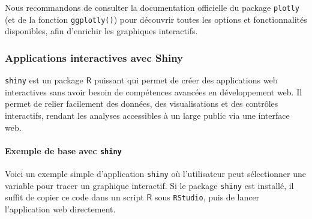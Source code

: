 \documentclass[
  letterpaper,
  DIV=11,
  numbers=noendperiod,
  oneside]{scrreprt}
\let\oldparagraph\paragraph
\renewcommand{\paragraph}[1]{\oldparagraph{#1}\mbox{}}
\begin{document}
Nous recommandons de consulter la documentation officielle du package
\texttt{plotly} (et de la fonction \texttt{ggplotly()}) pour découvrir
toutes les options et fonctionnalités disponibles, afin d'enrichir les
graphiques interactifs.

\hypertarget{applications-interactives-avec-shiny}{%
\subsubsection{Applications interactives avec
Shiny}\label{applications-interactives-avec-shiny}}

\texttt{shiny} est un package \(\textsf{R}\) puissant qui permet de
créer des applications web interactives sans avoir besoin de compétences
avancées en développement web. Il permet de relier facilement des
données, des visualisations et des contrôles interactifs, rendant les
analyses accessibles à un large public via une interface web.

\hypertarget{exemple-de-base-avec-shiny}{%
\paragraph{\texorpdfstring{Exemple de base avec
\texttt{shiny}}{Exemple de base avec shiny}}\label{exemple-de-base-avec-shiny}}

Voici un exemple simple d'application \texttt{shiny} où l'utilisateur
peut sélectionner une variable pour tracer un graphique interactif. Si
le package \texttt{shiny} est installé, il suffit de copier ce code dans
un script \(\textsf{R}\) sous \texttt{RStudio}, puis de lancer
l'application web directement.
\end{document}

